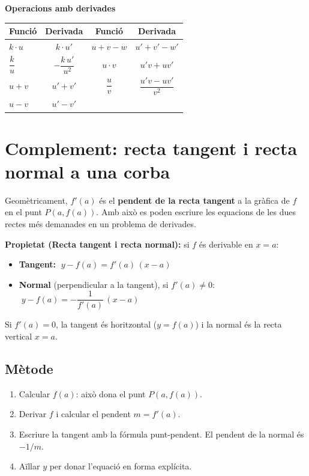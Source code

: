\textbf{Operacions amb derivades}

\begin{table}[!htbp]
\centering
\renewcommand{\arraystretch}{1.75}
\begin{tabular}{lccc}
\toprule
Funció & Derivada & Funció & Derivada \\
\midrule
$k\cdot u$ & $k\cdot u'$ & $u+v-w$ & $u'+v'-w'$ \\
$\displaystyle \dfrac{k}{u}$ & $\displaystyle -\dfrac{k\,u'}{u^2}$ & $u\cdot v$ & $u'v+uv'$ \\
$u+v$ & $u'+v'$ & $\displaystyle \dfrac{u}{v}$ & $\displaystyle \dfrac{u'v-uv'}{v^2}$ \\
$u-v$ & $u'-v'$ &  &  \\
\bottomrule
\end{tabular}
\end{table}

\section{Complement: recta tangent i recta normal a una corba}

Geomètricament, $f'(a)$ és el \textbf{pendent de la recta tangent} a la gràfica de $f$ en el punt $P(a, f(a))$. Amb això es poden escriure les equacions de les dues rectes més demanades en un problema de derivades.

\textbf{Propietat (Recta tangent i recta normal):} si $f$ és derivable en $x=a$:

\begin{itemize}
\item \textbf{Tangent:} $\;y - f(a) = f'(a)\,(x - a)$
\item \textbf{Normal} (perpendicular a la tangent), si $f'(a)\neq 0$: $\;y - f(a) = -\dfrac{1}{f'(a)}\,(x - a)$
\end{itemize}

Si $f'(a) = 0$, la tangent és horitzontal ($y = f(a)$) i la normal és la recta vertical $x = a$.

\subsection{Mètode}

\begin{enumerate}
\item Calcular $f(a)$: això dona el punt $P(a, f(a))$.
\item Derivar $f$ i calcular el pendent $m = f'(a)$.
\item Escriure la tangent amb la fórmula punt-pendent. El pendent de la normal és $-1/m$.
\item Aïllar $y$ per donar l'equació en forma explícita.
\end{enumerate}

